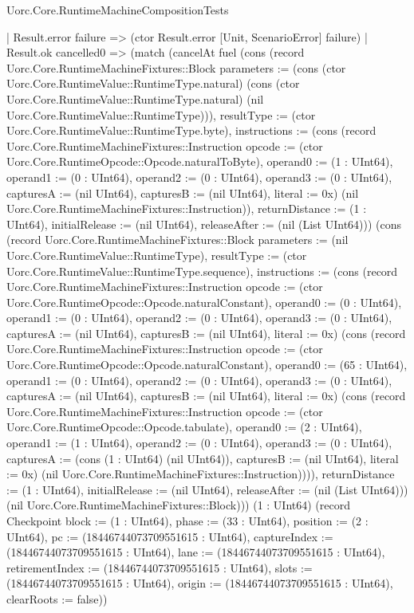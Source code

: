 \begin{lexlean}{Uorc.Core.RuntimeMachineCompositionTests}
\begin{semanticmodule}
{    | Result.error failure => (ctor Result.error [Unit, ScenarioError] failure)
    | Result.ok cancelled0 => (match (cancelAt fuel (cons (record Uorc.Core.RuntimeMachineFixtures::Block {parameters := (cons (ctor Uorc.Core.RuntimeValue::RuntimeType.natural) (cons (ctor Uorc.Core.RuntimeValue::RuntimeType.natural) (nil Uorc.Core.RuntimeValue::RuntimeType))), resultType := (ctor Uorc.Core.RuntimeValue::RuntimeType.byte), instructions := (cons (record Uorc.Core.RuntimeMachineFixtures::Instruction {opcode := (ctor Uorc.Core.RuntimeOpcode::Opcode.naturalToByte), operand0 := (1 : UInt64), operand1 := (0 : UInt64), operand2 := (0 : UInt64), operand3 := (0 : UInt64), capturesA := (nil UInt64), capturesB := (nil UInt64), literal := 0x}) (nil Uorc.Core.RuntimeMachineFixtures::Instruction)), returnDistance := (1 : UInt64), initialRelease := (nil UInt64), releaseAfter := (nil (List UInt64))}) (cons (record Uorc.Core.RuntimeMachineFixtures::Block {parameters := (nil Uorc.Core.RuntimeValue::RuntimeType), resultType := (ctor Uorc.Core.RuntimeValue::RuntimeType.sequence), instructions := (cons (record Uorc.Core.RuntimeMachineFixtures::Instruction {opcode := (ctor Uorc.Core.RuntimeOpcode::Opcode.naturalConstant), operand0 := (0 : UInt64), operand1 := (0 : UInt64), operand2 := (0 : UInt64), operand3 := (0 : UInt64), capturesA := (nil UInt64), capturesB := (nil UInt64), literal := 0x}) (cons (record Uorc.Core.RuntimeMachineFixtures::Instruction {opcode := (ctor Uorc.Core.RuntimeOpcode::Opcode.naturalConstant), operand0 := (65 : UInt64), operand1 := (0 : UInt64), operand2 := (0 : UInt64), operand3 := (0 : UInt64), capturesA := (nil UInt64), capturesB := (nil UInt64), literal := 0x}) (cons (record Uorc.Core.RuntimeMachineFixtures::Instruction {opcode := (ctor Uorc.Core.RuntimeOpcode::Opcode.tabulate), operand0 := (2 : UInt64), operand1 := (1 : UInt64), operand2 := (0 : UInt64), operand3 := (0 : UInt64), capturesA := (cons (1 : UInt64) (nil UInt64)), capturesB := (nil UInt64), literal := 0x}) (nil Uorc.Core.RuntimeMachineFixtures::Instruction)))), returnDistance := (1 : UInt64), initialRelease := (nil UInt64), releaseAfter := (nil (List UInt64))}) (nil Uorc.Core.RuntimeMachineFixtures::Block))) (1 : UInt64) (record Checkpoint {block := (1 : UInt64), phase := (33 : UInt64), position := (2 : UInt64), pc := (18446744073709551615 : UInt64), captureIndex := (18446744073709551615 : UInt64), lane := (18446744073709551615 : UInt64), retirementIndex := (18446744073709551615 : UInt64), slots := (18446744073709551615 : UInt64), origin := (18446744073709551615 : UInt64), clearRoots := false}))
}
\end{semanticmodule}
\end{lexlean}
